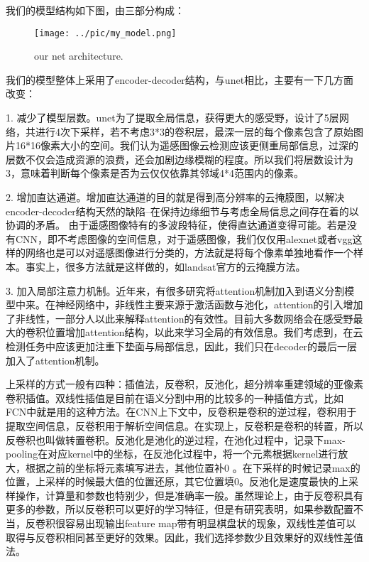 \documentclass[UTF8]{ctexart}
\begin{document}
我们的模型结构如下图，由三部分构成：
\begin{figure}[ht]
    \centering
    \texttt{[image: ../pic/my\_model.png]}
    \caption{our net architecture.}
    \label{fig:label}
\end{figure}

我们的模型整体上采用了encoder-decoder结构，与unet相比，主要有一下几方面改变：

1. 减少了模型层数。unet为了提取全局信息，获得更大的感受野，设计了5层网络，共进行4次下采样，若不考虑3*3的卷积层，最深一层的每个像素包含了原始图片16*16像素大小的空间。我们认为遥感图像云检测应该更侧重局部信息，过深的层数不仅会造成资源的浪费，还会加剧边缘模糊的程度。所以我们将层数设计为3，意味着判断每个像素是否为云仅仅依靠其邻域4*4范围内的像素。

2. 增加直达通道。增加直达通道的目的就是得到高分辨率的云掩膜图，以解决encoder-decoder结构天然的缺陷--在保持边缘细节与考虑全局信息之间存在着的以协调的矛盾。
由于遥感图像特有的多波段特征，使得直达通道变得可能。若是没有CNN，即不考虑图像的空间信息，对于遥感图像，我们仅仅用alexnet或者vgg这样的网络也是可以对遥感图像进行分类的，方法就是将每个像素单独地看作一个样本。事实上，很多方法就是这样做的，如landsat官方的云掩膜方法\cite{zhu2012object}。

3. 加入局部注意力机制。近年来，有很多研究将attention机制加入到语义分割模型中来。在神经网络中，非线性主要来源于激活函数与池化，attention的引入增加了非线性，一部分人以此来解释attention的有效性。目前大多数网络会在感受野最大的卷积位置增加attention结构，以此来学习全局的有效信息。我们考虑到，在云检测任务中应该更加注重下垫面与局部信息，因此，我们只在decoder的最后一层加入了attention机制。

上采样的方式一般有四种：插值法，反卷积，反池化，超分辨率重建领域的亚像素卷积插值。双线性插值是目前在语义分割中用的比较多的一种插值方式，比如FCN中就是用的这种方法。在CNN上下文中，反卷积是卷积的逆过程，卷积用于提取空间信息，反卷积用于解析空间信息。在实现上，反卷积是卷积的转置，所以反卷积也叫做转置卷积。反池化是池化的逆过程，在池化过程中，记录下max-pooling在对应kernel中的坐标，在反池化过程中，将一个元素根据kernel进行放大，根据之前的坐标将元素填写进去，其他位置补0 。在下采样的时候记录max的位置，上采样的时候最大值的位置还原，其它位置填0。反池化是速度最快的上采样操作，计算量和参数也特别少，但是准确率一般。虽然理论上，由于反卷积具有更多的参数，所以反卷积可以更好的学习特征，但是有研究表明，如果参数配置不当，反卷积很容易出现输出feature map带有明显棋盘状的现象\cite{odena2016deconvolution}，双线性差值可以取得与反卷积相同甚至更好的效果。因此，我们选择参数少且效果好的双线性差值法。
\end{document}

